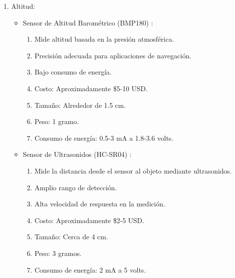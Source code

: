 \begin{enumerate}
\item Altitud:
\begin{itemize}
    \item Sensor de Altitud Barométrico (BMP180) \cite{92}:
\begin{enumerate}
        \item Mide altitud basada en la presión atmosférica.
        \item Precisión adecuada para aplicaciones de navegación.
        \item Bajo consumo de energía.
        \item Costo: Aproximadamente \$5-10 USD.
        \item Tamaño: Alrededor de 1.5 cm.
        \item Peso: 1 gramo.
        \item Consumo de energía: 0.5-3 mA a 1.8-3.6 volts.
\end{enumerate}
    \item Sensor de Ultrasonidos (HC-SR04) \cite{93}:
\begin{enumerate}
        \item Mide la distancia desde el sensor al objeto mediante ultrasonidos.
        \item Amplio rango de detección.
        \item Alta velocidad de respuesta en la medición.
        \item Costo: Aproximadamente \$2-5 USD.
        \item Tamaño: Cerca de 4 cm.
        \item Peso: 3 gramos.
        \item Consumo de energía: 2 mA a 5 volts.

\end{enumerate}
\end{itemize}


\end{enumerate}
